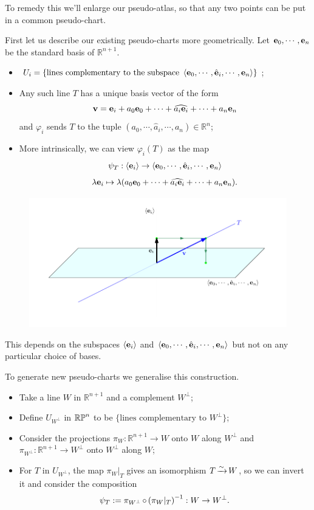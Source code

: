 \documentclass[a4paper,11pt]{article}
\begin{document}
	To remedy this we'll enlarge our pseudo-atlas, so that any two points can be put in a common pseudo-chart.

	First let us describe our existing pseudo-charts more geometrically. Let $\vb e_0, \cdots, \vb e_n$ be the standard basis of $\mathbb{R}^{n+1}$.

	\begin{itemize}
		\item $U_i = \{\text{lines complementary to the subspace }\expval{\vb e_0, \cdots, \hat{\vb e}_i, \cdots, \vb e_n}\}$;
		\item Any such line $T$ has a unique basis vector of the form \[
			\vb v = \vb e_i + a_0 \vb e_0 + \cdots + \widehat{a_i \vb e_i} + \cdots + a_n \vb e_n
		\]
		and $\varphi_i$ sends $T$ to the tuple $(a_0, \cdots, \hat{a}_i, \cdots , a_n) \in \mathbb{R}^n$;
		\item More intrinsically, we can view $\varphi_i (T)$ as the map \[
			\psi_T : \expval{\vb e_i} \to \expval{\vb e_0 , \cdots , \hat{\vb e}_i, \cdots, \vb e_n}
		\]
		\[
			\lambda \vb e_i \mapsto \lambda (a_0 \vb e_0 + \cdots + \widehat{a_i \vb e_i} + \cdots + a_n \vb e_n).
		\]
	\end{itemize}
	
	\begin{figure}[H]
		\centering
		\includegraphics[width=\linewidth]{fig/fig7.pdf}
	\end{figure}

	This depends on the subspaces $\expval{\vb e_i}$ and $\expval{\vb e_0, \cdots, \hat{\vb e}_i, \cdots, \vb e_n}$ but not on any particular choice of bases.

	To generate new pseudo-charts we generalise this construction.
	\begin{itemize}
		\item Take a line $W$ in $\mathbb{R}^{n+1}$ and a complement $W^\perp$;
		\item Define $U_{W^\perp}$ in $\mathbb{RP}^{n}$ to be $\{\text{lines complementary to }W^\perp\}$;
		\item Consider the projections $\pi_W : \mathbb{R}^{n+1} \to W$ onto $W$ along $W^\perp$ and $\pi_{W^\perp}: \mathbb{R}^{n+1}\to W^\perp$ onto $W^\perp$ along $W$;
		\item For $T$ in $U_{W^\perp}$, the map $\pi_W |_T$ gives an isomorphism $T \operatorname{\xrightarrow{\sim}} W$, so we can invert it and consider the composition \[
			\psi_T := \pi_{W^\perp} \operatorname{\circ} \left( \pi_W|_T \right)^{-1} : W \to W^\perp.
		\]
	\end{itemize}
	
\end{document}
